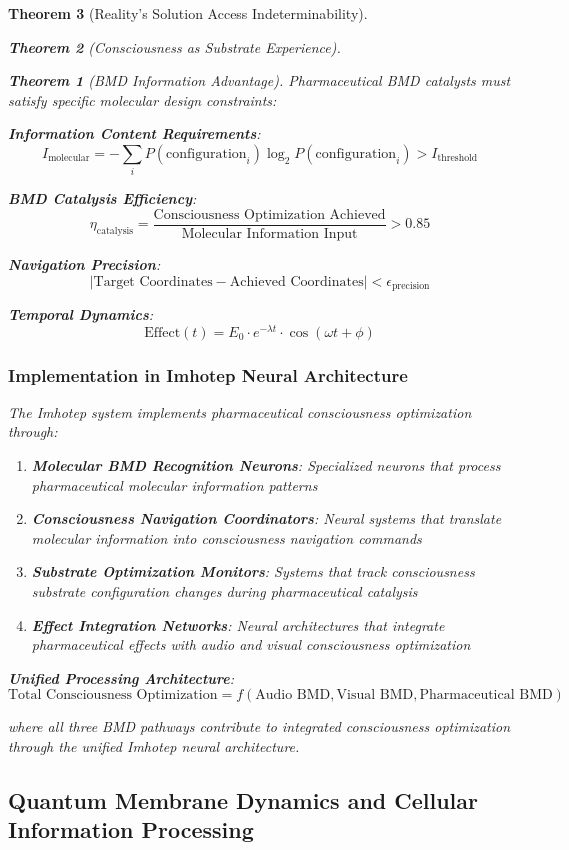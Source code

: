 \documentclass[12pt,a4paper]{article}
\newtheorem{theorem}{Theorem}[section]
\theoremstyle{remark}
\begin{document}
\begin{theorem}[Reality's Solution Access Indeterminability]
\begin{theorem}[Consciousness as Substrate Experience]
\begin{theorem}[BMD Information Advantage]
Pharmaceutical BMD catalysts must satisfy specific molecular design constraints:

\textbf{Information Content Requirements}:
$$I_{\text{molecular}} = -\sum_i P(\text{configuration}_i) \log_2 P(\text{configuration}_i) > I_{\text{threshold}}$$

\textbf{BMD Catalysis Efficiency}:
$$\eta_{\text{catalysis}} = \frac{\text{Consciousness Optimization Achieved}}{\text{Molecular Information Input}} > 0.85$$

\textbf{Navigation Precision}:
$$|\text{Target Coordinates} - \text{Achieved Coordinates}| < \epsilon_{\text{precision}}$$

\textbf{Temporal Dynamics}:
$$\text{Effect}(t) = E_0 \cdot e^{-\lambda t} \cdot \cos(\omega t + \phi)$$

\subsubsection{Implementation in Imhotep Neural Architecture}

The Imhotep system implements pharmaceutical consciousness optimization through:

\begin{enumerate}
\item \textbf{Molecular BMD Recognition Neurons}: Specialized neurons that process pharmaceutical molecular information patterns
\item \textbf{Consciousness Navigation Coordinators}: Neural systems that translate molecular information into consciousness navigation commands
\item \textbf{Substrate Optimization Monitors}: Systems that track consciousness substrate configuration changes during pharmaceutical catalysis
\item \textbf{Effect Integration Networks}: Neural architectures that integrate pharmaceutical effects with audio and visual consciousness optimization
\end{enumerate}

\textbf{Unified Processing Architecture}:
$$\text{Total Consciousness Optimization} = f(\text{Audio BMD}, \text{Visual BMD}, \text{Pharmaceutical BMD})$$

where all three BMD pathways contribute to integrated consciousness optimization through the unified Imhotep neural architecture.

\subsection{Quantum Membrane Dynamics and Cellular Information Processing}


\end{theorem}
\end{theorem}
\end{theorem}
\end{document}
